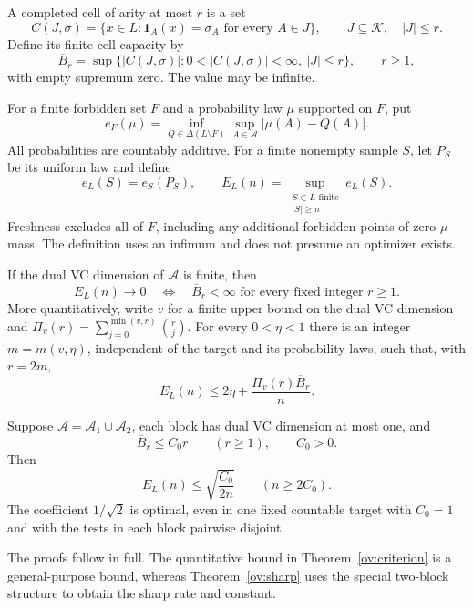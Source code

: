 A completed cell of arity at most $r$ is a set
\[
 C(J,\sigma)=\{x\in L:\mathbf1_A(x)=\sigma_A\text{ for every }A\in J\},
 \qquad J\subseteq\mathcal K,\quad |J|\le r.
\]
Define its finite-cell capacity by
\[
 \overline B_r=\sup\{|C(J,\sigma)|:0<|C(J,\sigma)|<\infty,\ |J|\le r\},
 \qquad r\ge1,
\]
with empty supremum zero. The value may be infinite.

For a finite forbidden set $F$ and a probability law $\mu$ supported on $F$, put
\[
 e_F(\mu)=\inf_{Q\in\Delta(L\setminus F)}
              \sup_{A\in\mathcal A}|\mu(A)-Q(A)|.
\]
All probabilities are countably additive. For a finite nonempty sample $S$, let $P_S$ be its uniform law and define
\[
 e_L(S)=e_S(P_S),\qquad
 E_L(n)=\sup_{\substack{S\subset L\text{ finite}\\|S|\ge n}}e_L(S).
\]
Freshness excludes all of $F$, including any additional forbidden points of zero $\mu$-mass. The definition uses an infimum and does not presume an optimizer exists.

\begin{theorem}\label{ov:criterion}
If the dual VC dimension of $\mathcal A$ is finite, then
\[
 E_L(n)\longrightarrow0
 \quad\Longleftrightarrow\quad
 \overline B_r<\infty\text{ for every fixed integer }r\ge1.
\]
More quantitatively, write $v$ for a finite upper bound on the dual VC dimension and $\Pi_v(r)=\sum_{j=0}^{\min(v,r)}\binom rj$. For every $0<\eta<1$ there is an integer $m=m(v,\eta)$, independent of the target and its probability laws, such that, with $r=2m$,
\begin{equation}\label{ov:quantitative}
 E_L(n)\le 2\eta+\frac{\Pi_v(r)\overline B_r}{n}.
\end{equation}
\end{theorem}

\begin{theorem}\label{ov:sharp}
Suppose $\mathcal A=\mathcal A_1\cup\mathcal A_2$, each block has dual VC dimension at most one, and
\[
 \overline B_r\le C_0r\qquad(r\ge1),\qquad C_0>0.
\]
Then
\begin{equation}\label{ov:sqrt}
 E_L(n)\le\sqrt{\frac{C_0}{2n}}\qquad(n\ge2C_0).
\end{equation}
The coefficient $1/\sqrt2$ is optimal, even in one fixed countable target with $C_0=1$ and with the tests in each block pairwise disjoint.
\end{theorem}

The proofs follow in full. The quantitative bound in Theorem~\ref{ov:criterion} is a general-purpose bound, whereas Theorem~\ref{ov:sharp} uses the special two-block structure to obtain the sharp rate and constant.

